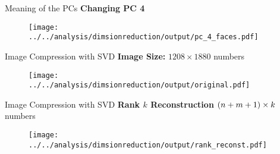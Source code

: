 \documentclass[aspectratio=169]{beamer}
\def\lp{\ensuremath\left(}
\def\rp{\ensuremath\right)}
\begin{document}
\begin{frame}[t]{Meaning of the PCs}
  \textbf{Changing PC 4}
  \begin{figure}
    \centering
    \texttt{[image: ../../analysis/dimsionreduction/output/pc\_4\_faces.pdf]}
  \end{figure}
\end{frame}


\begin{frame}[t]{Image Compression with SVD}
  \textbf{Image Size: } $ 1208  \times 1880$ numbers
  \begin{figure}
    \centering
    \texttt{[image: ../../analysis/dimsionreduction/output/original.pdf]}
  \end{figure}
\end{frame}


\begin{frame}[t]{Image Compression with SVD}
  \textbf{Rank $k$ Reconstruction} $\lp n + m + 1 \rp \times k$ numbers
  \begin{figure}
    \centering
    \texttt{[image: ../../analysis/dimsionreduction/output/rank\_reconst.pdf]}
  \end{figure}
\end{frame}
\end{document}
